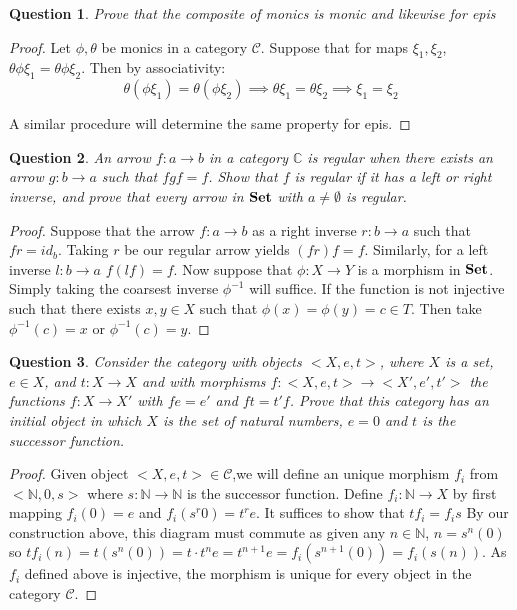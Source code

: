 \documentclass[12pt]{article}
\newtheorem{question}{Question}[section]
\theoremstyle{remark}
\begin{document}
\begin{question}
 Prove that the composite of monics is monic and likewise for epis
\end{question}
 
\begin{proof}
 Let $\phi,\theta$ be monics in a category $\mathcal{C}$. Suppose that for maps $\xi_1,\xi_2$, $\theta\phi \xi_1 = \theta\phi\xi_2$. Then by associativity:
 $$ \theta(\phi\xi_1) = \theta(\phi\xi_2) \implies \theta \xi_1= \theta \xi_2 \implies \xi_1 = \xi_2$$
 
 A similar procedure will determine the same property for epis.
\end{proof}

\begin{question}
 An arrow $f: a \rightarrow b$ in a category $\mathbb{C}$ is regular when there exists an arrow $g: b \rightarrow a$ such that $fgf = f$. Show that $f$ is regular if it has a left or right inverse, and prove that every arrow in ${\bf Set}$ with $a \neq \emptyset$ is regular.
\end{question}

\begin{proof}
Suppose that the arrow $f: a \rightarrow b$ as a right inverse $r:b \rightarrow a$ such that $fr = id_b$. Taking $r$ be our regular arrow yields $(fr)f = f$. Similarly, for a left inverse $l: b \rightarrow a$ $f(lf) = f$. Now suppose that $\phi: X \rightarrow Y$ is a morphism in ${\bf Set}$. Simply taking the coarsest inverse $\phi^{-1}$ will suffice. If the function is not injective such that there exists $x,y \in X$ such that $\phi(x) = \phi(y) = c \in T$. Then take $\phi^{-1}(c) = x$ or $\phi^{-1}(c) = y$. 
\end{proof}

\begin{question}
 Consider the category with objects $<X,e,t>$, where $X$ is a set, $e \in X$, and $t:X \rightarrow X$ and with morphisms $f:<X,e,t> \rightarrow <X',e',t'>$ the functions $f: X \rightarrow X'$ with $fe = e'$ and $ft = t'f$. Prove that this category has an initial object in which $X$ is the set of natural numbers, $e =0$ and $t$ is the successor function.
\end{question}

\begin{proof}
 Given object $<X,e,t> \in \mathcal{C}$,we will define an unique morphism $f_i$ from $<\mathbb{N},0,s>$ where $s:\mathbb{N} \rightarrow \mathbb{N}$ is the successor function. Define $f_i: \mathbb{N} \rightarrow X$ by first mapping 
 $f_i(0) = e$ and $f_i(s^r0) = t^re$. It suffices to show that $tf_i = f_is$ By our construction above, this diagram must commute as given any $n \in \mathbb{N}$, $n = s^n(0)$ so $tf_i(n) = t(s^n(0)) = t\cdot t^ne = t^{n+1}e = f_i(s^{n+1}(0)) = f_i(s(n))$. As $f_i$ defined above is injective, the morphism is unique for every object in the category $\mathcal{C}$.
\end{proof}
\end{document}

